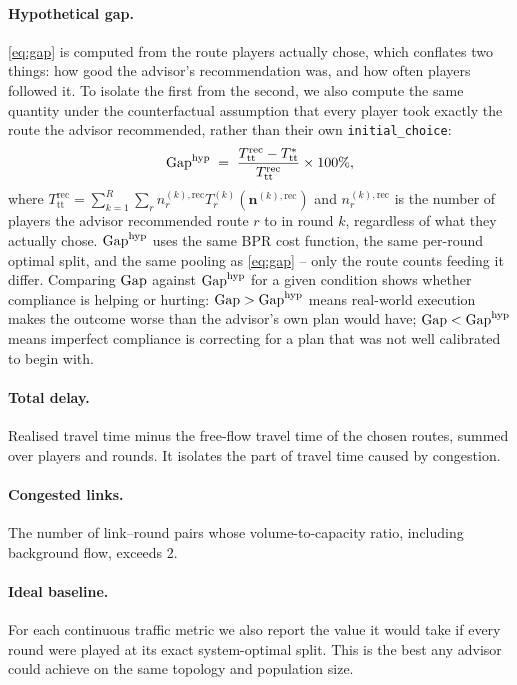 \paragraph{Hypothetical gap.} \cref{eq:gap} is computed from the route players actually chose, which conflates two things: how good the advisor's recommendation was, and how often players followed it. To isolate the first from the second, we also compute the same quantity under the counterfactual assumption that every player took exactly the route the advisor recommended, rather than their own \texttt{initial\_choice}:
\begin{equation}
  \mathrm{Gap}^{\mathrm{hyp}} \;=\; \frac{T^{\mathrm{rec}}_{\mathrm{tt}} - T^{\ast}_{\mathrm{tt}}}{T^{\mathrm{rec}}_{\mathrm{tt}}} \times 100\%,
  \label{eq:gap-hyp}
\end{equation}
where $T^{\mathrm{rec}}_{\mathrm{tt}} = \sum_{k=1}^{R} \sum_{r} n_r^{(k),\mathrm{rec}} T_r^{(k)}(\mathbf{n}^{(k),\mathrm{rec}})$ and $n_r^{(k),\mathrm{rec}}$ is the number of players the advisor recommended route $r$ to in round $k$, regardless of what they actually chose. $\mathrm{Gap}^{\mathrm{hyp}}$ uses the same BPR cost function, the same per-round optimal split, and the same pooling as \cref{eq:gap} -- only the route counts feeding it differ. Comparing $\mathrm{Gap}$ against $\mathrm{Gap}^{\mathrm{hyp}}$ for a given condition shows whether compliance is helping or hurting: $\mathrm{Gap} > \mathrm{Gap}^{\mathrm{hyp}}$ means real-world execution makes the outcome worse than the advisor's own plan would have; $\mathrm{Gap} < \mathrm{Gap}^{\mathrm{hyp}}$ means imperfect compliance is correcting for a plan that was not well calibrated to begin with.

\paragraph{Total delay.} Realised travel time minus the free-flow travel time of the chosen routes, summed over players and rounds. It isolates the part of travel time caused by congestion.

\paragraph{Congested links.} The number of link--round pairs whose volume-to-capacity ratio, including background flow, exceeds 2.

\paragraph{Ideal baseline.} For each continuous traffic metric we also report the value it would take if every round were played at its exact system-optimal split. This is the best any advisor could achieve on the same topology and population size. 

